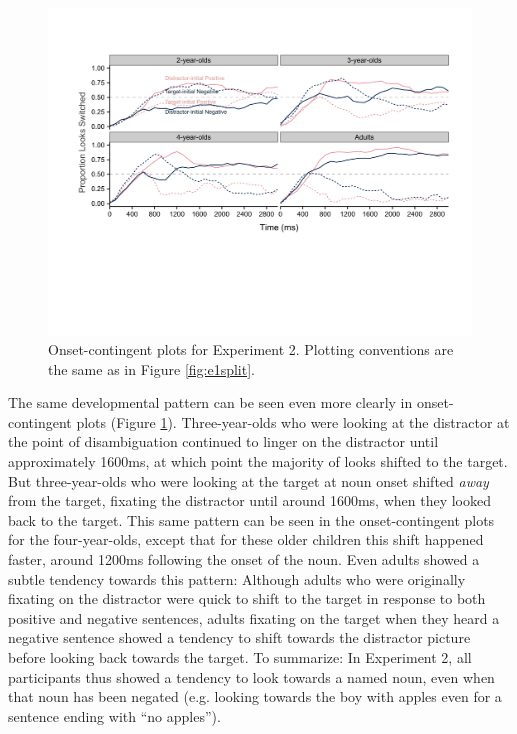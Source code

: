 \documentclass[man]{apa2}
\begin{document}
\begin{figure}[t]
\begin{center} 
\includegraphics[width=6in]{OC_something.pdf}
\caption{\label{fig:e2split} Onset-contingent plots for Experiment 2. Plotting conventions are the same as in Figure \ref{fig:e1split}.}
\end{center} 
\end{figure}

The same developmental pattern can be seen even more clearly in onset-contingent plots (Figure \ref{fig:e2split}).  Three-year-olds who were looking at the distractor at the point of disambiguation continued to linger on the distractor until approximately 1600ms, at which point the majority of looks shifted to the target.  But three-year-olds who were looking at the target at noun onset shifted \emph{away} from the target, fixating the distractor until around 1600ms, when they looked back to the target.  This same pattern can be seen in the onset-contingent plots for the four-year-olds, except that for these older children this shift happened faster, around 1200ms following the onset of the noun.  Even adults showed a subtle tendency towards this pattern: Although adults who were originally fixating on the distractor were quick to shift to the target in response to both positive and negative sentences, adults fixating on the target when they heard a negative sentence showed a tendency to shift towards the distractor picture before looking back towards the target.  To summarize: In Experiment 2, all participants thus showed a tendency to look towards a named noun, even when that noun has been negated (e.g. looking towards the boy with apples even for a sentence ending with ``no apples''). 
\end{document}
